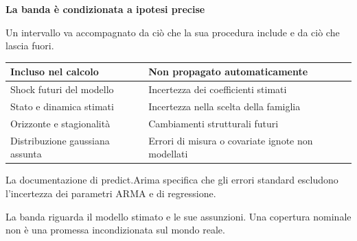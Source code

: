 \documentclass[12pt,aspectratio=1610]{beamer}
\newcommand{\PBody}[1]{\par{\fontsize{11.3}{14.8}\selectfont #1\par}}
\newcommand{\PSmall}[1]{\par{\fontsize{9.8}{13.1}\selectfont #1\par}}
\newcommand{\PInfo}[1]{%
\begin{tcolorbox}[enhanced,arc=1.6mm,boxrule=.55pt,colback=GeoTint,
 colframe=Rule!80!Classical,left=2.3mm,right=2.3mm,top=2mm,bottom=2mm,
 before skip=1mm,after skip=1mm]
\PSmall{#1}\end{tcolorbox}}
\begin{document}
\begin{frame}[plain]\hypertarget{slide89}{}
\begin{lrbox}{\TitleBox}
\begin{minipage}[t]{17.7cm}\raggedright\color{Ink}\fontsize{11.3}{14.8}\selectfont
\color{Navy}\bfseries\fontsize{20.6}{24.5}\selectfont La banda è condizionata a ipotesi precise
\end{minipage}\end{lrbox}

\begin{lrbox}{\RecallBox}
\begin{minipage}[t]{14.3cm}\raggedright\color{Ink}\fontsize{11.3}{14.8}\selectfont
\fontsize{10.3}{13.8}\selectfont Un intervallo va accompagnato da ciò che la sua procedura include e da ciò che lascia fuori.
\end{minipage}\end{lrbox}

\begin{lrbox}{\PilotLeftBox}
\begin{minipage}[t]{10.05cm}\raggedright\color{Ink}\fontsize{11.3}{14.8}\selectfont
{\fontsize{10.2}{13.1}\selectfont\renewcommand{\arraystretch}{1.45}\begin{tabular}{@{}p{4.5cm}p{4.6cm}@{}}\toprule
\textbf{Incluso nel calcolo} & \textbf{Non propagato automaticamente}\\\midrule
Shock futuri del modello & Incertezza dei coefficienti stimati\\
Stato e dinamica stimati & Incertezza nella scelta della famiglia\\
Orizzonte e stagionalità & Cambiamenti strutturali futuri\\
Distribuzione gaussiana assunta & Errori di misura o covariate ignote non modellati\\
\bottomrule\end{tabular}}

\end{minipage}\end{lrbox}

\begin{lrbox}{\PilotRightBox}
\begin{minipage}[t]{7.55cm}\raggedright\color{Ink}\fontsize{11.3}{14.8}\selectfont
\PBody{La documentazione di predict.Arima specifica che gli errori standard escludono l’incertezza dei parametri ARMA e di regressione.}
\vspace{2.5mm}
\PInfo{La banda riguarda il modello stimato e le sue assunzioni. Una copertura nominale non è una promessa incondizionata sul mondo reale.}


\end{minipage}
\end{lrbox}
\end{frame}
\end{document}
